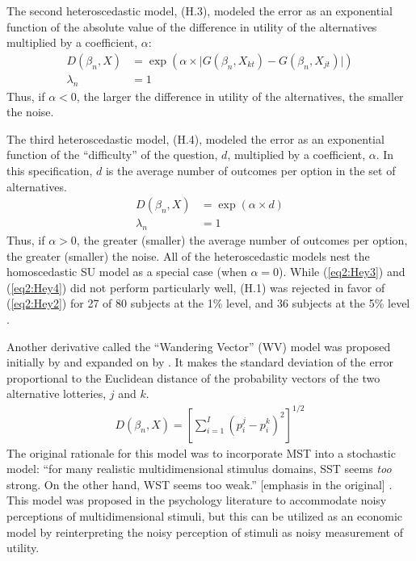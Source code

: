 \documentclass[../main.tex]{subfiles}
\begin{document}
The second heteroscedastic model, (H.3), modeled the error as an exponential function of the absolute value of the difference in utility of the alternatives multiplied by a coefficient, $\alpha$:
\begin{align*}
	\tag{H.3}
	\label{eq2:Hey3}
	D(\beta_n,X) &= \exp\left(\alpha \times \lvert G(\beta_n,X_{kt}) - G(\beta_n,X_{jt}) \rvert\right)\\
	\lambda_n &= 1
\end{align*}
Thus, if $\alpha < 0$, the larger the difference in utility of the alternatives, the smaller the noise.

The third heteroscedastic model, (H.4), modeled the error as an exponential function of the \enquote{difficulty} of the question, $d$, multiplied by a coefficient, $\alpha$.
In this specification, $d$ is the average number of outcomes per option in the set of alternatives.
\begin{align*}
	\tag{H.4}
	\label{eq2:Hey4}
	D(\beta_n,X) &= \exp(\alpha \times d)\\
	\lambda_n &= 1
\end{align*}
Thus, if $\alpha > 0$, the greater (smaller) the average number of outcomes per option, the greater (smaller) the noise.
All of the heteroscedastic models nest the homoscedastic SU model as a special case (when $\alpha=0$).
While (\ref{eq2:Hey3}) and (\ref{eq2:Hey4}) did not perform particularly well, (H.1) was rejected in favor of (\ref{eq2:Hey2}) for 27 of 80 subjects at the 1\% level, and 36 subjects at the 5\% level \parencite*[639]{Hey1995a}.

Another derivative called the \enquote{Wandering Vector} (WV) model was proposed initially by \textcite{Carroll1980} and expanded on by \textcite{Carroll1991}.
It makes the standard deviation of the error proportional to the Euclidean distance of the probability vectors of the two alternative lotteries, $j$ and $k$.
\begin{align*}
	D(\beta_n,X) = \left[  \sum_{i=1}^I (p_i^j - p_i^k)^2 \right]^{1/2}
\end{align*}
The original rationale for this model was to incorporate MST into a stochastic model: \enquote{for many realistic multidimensional stimulus domains, SST seems \textit{too} strong.
On the other hand, WST seems too weak.} [emphasis in the original] \parencite*[343]{Carroll1991}.
This model was proposed in the psychology literature to accommodate noisy perceptions of multidimensional stimuli, but this can be utilized as an economic model by reinterpreting the noisy perception of stimuli as noisy measurement of utility.
\end{document}
